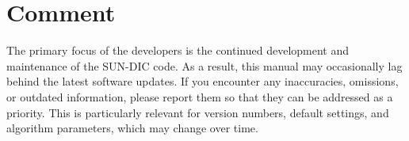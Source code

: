 \chapter{Comment}
\label{sec:comment}

\begin{grayquote}
	The primary focus of the developers is the continued development and maintenance of the SUN-DIC code. As a result, this manual may occasionally lag behind the latest software updates. If you encounter any inaccuracies, omissions, or outdated information, please report them so that they can be addressed as a priority. This is particularly relevant for version numbers, default settings, and algorithm parameters, which may change over time.
\end{grayquote}